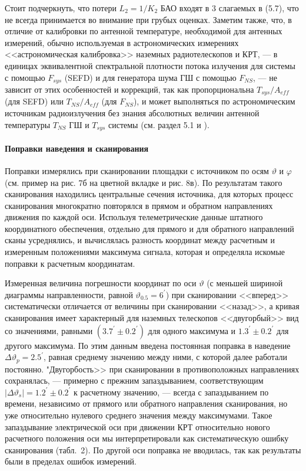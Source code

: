 Стоит подчеркнуть, что потери $L_2 = 1 / K_2$ БАО входят в 3 слагаемых в (5.7), что не всегда
принимается во внимание при грубых оценках. Заметим также, что, в отличие от калибровки по антенной
температуре, необходимой для антенных измерений, обычно используемая в астрономических измерениях
<<астрономическая калибровка>> наземных радиотелескопов и КРТ, --- в единицах эквивалентной
спектральной плотности потока излучения для системы с помощью $F_{sys}$ (SEFD) и для генератора шума
ГШ  с помощью $F_{NS}$,   --- не зависит от этих особенностей и коррекций, так как пропорциональна
$T_{sys}/A_{eff}$ (для SEFD) или $T_{NS} / A_{eff}$ (для $F_{NS}$), и может выполняться по
астрономическим источникам радиоизлучения без знания абсолютных величин антенной температуры
$T_{NS}$ ГШ и $T_{sys}$ системы (см. раздел 5.1 и \cite{Kovalev_1999}).

\paragraph{Поправки наведения и сканирования}

Поправки измерялись при сканировании площадки с источником
по осям $\vartheta$ и $\varphi$ (см. пример на рис. 7б на цветной вкладке и рис. 8в).
По результатам такого сканирования находились центральные
сечения источника, для которых процесс сканирования многократно
повторялся в прямом и обратном направлениях движения по каждой оси.
Используя телеметрические данные штатного координатного обеспечения,
отдельно для прямого и для обратного направлений сканы
усреднялись, и вычислялась разность координат между расчетным и
измеренным положениями максимума сигнала, которая и определяла
искомые поправки к расчетным координатам.

Измеренная величина погрешности координат по оси $\vartheta$ (с меньшей шириной
диаграммы направленности, равной $\vartheta_{0.5} = 6^\prime$)
при сканировании <<вперед>> систематически отличается от величины
при сканировании <<назад>>, а кривая сканирования имеет характерный для наземных
телескопов <<двугорбый>> вид  со значениями, равными $(3.7^\prime \pm 0.2^\prime)$
для одного максимума и $ 1.3^\prime \pm 0.2^\prime $    для другого максимума.
По этим данным введена постоянная поправка в наведение
$\Delta \vartheta_p = 2.5^\prime$,
равная среднему значению между ними, с которой далее  работали постоянно.
"Двугорбость>> при сканировании в противоположных направлениях сохранялась,
--- примерно с прежним запаздыванием, соответствующим
$\vert \Delta \vartheta_s \vert = 1.2^\prime \pm 0.2^\prime$ к расчетному значению, ---
всегда с запаздыванием по времени, независимо от прямого или обратного
направления сканирования, но уже относительно нулевого среднего значения
между максимумами. Такое запаздывание электрической оси при движении КРТ
относительно нового расчетного положения оси мы интерпретировали как
систематическую ошибку сканирования (табл.~2).
По другой оси поправка не вводилась, так как результаты
были в пределах ошибок измерений.

